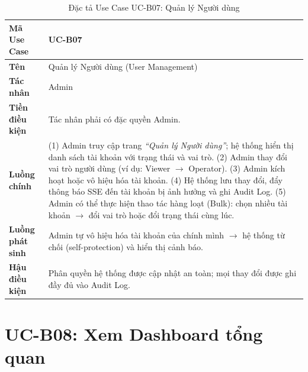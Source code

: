 \documentclass[../DoAn.tex]{subfiles}
\begin{document}
\begin{longtable}{|p{3.5cm}|p{10.0cm}|}
\caption{Đặc tả Use Case UC-B07: Quản lý Người dùng}\label{tab:ucb07}\\
\hline
\textbf{Mã Use Case} & UC-B07 \\
\hline
\textbf{Tên} & Quản lý Người dùng (User Management) \\
\hline
\textbf{Tác nhân} & Admin \\
\hline
\textbf{Tiền điều kiện} & Tác nhân phải có đặc quyền Admin. \\
\hline
\textbf{Luồng chính} &
(1) Admin truy cập trang \textit{``Quản lý Người dùng''}; hệ thống hiển thị danh sách tài khoản với trạng thái và vai trò. \newline
(2) Admin thay đổi vai trò người dùng (ví dụ: Viewer $\to$ Operator). \newline
(3) Admin kích hoạt hoặc vô hiệu hóa tài khoản. \newline
(4) Hệ thống lưu thay đổi, đẩy thông báo SSE đến tài khoản bị ảnh hưởng và ghi Audit Log. \newline
(5) Admin có thể thực hiện thao tác hàng loạt (Bulk): chọn nhiều tài khoản $\to$ đổi vai trò hoặc đổi trạng thái cùng lúc. \\
\hline
\textbf{Luồng phát sinh} & Admin tự vô hiệu hóa tài khoản của chính mình $\to$ hệ thống từ chối (self-protection) và hiển thị cảnh báo. \\
\hline
\textbf{Hậu điều kiện} & Phân quyền hệ thống được cập nhật an toàn; mọi thay đổi được ghi đầy đủ vào Audit Log. \\
\hline
\end{longtable}

\section{UC-B08: Xem Dashboard tổng quan}
\end{document}
